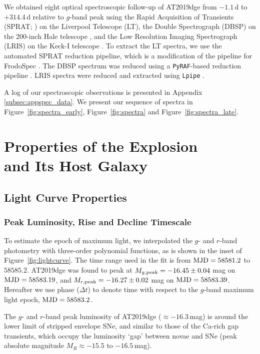 \documentclass[twocolumn]{aastex63}
\begin{document}
\begin{CJK*}{UTF8}{gbsn}
We obtained eight optical spectroscopic follow-up of AT2019dge from $-1.1$\,d to $+314.4$\,d relative 
to $g$-band peak using the Rapid Acquisition of Transients (SPRAT; \citealt{Piascik2014}) on the 
Liverpool Telescope (LT), the Double Spectrograph (DBSP) on the 200-inch Hale telescope 
\citep{Oke1982}, and the Low Resolution Imaging Spectrograph (LRIS) on the Keck-I telescope 
\citep{Oke1995}. To extract the LT spectra, we use the automated SPRAT reduction pipeline, which is a 
modification of the pipeline for FrodoSpec \citep{Barnsley2012}. The DBSP spectrum was reduced using 
a \texttt{PyRAF}-based reduction pipeline \citep{Bellm2016}. LRIS 
spectra were reduced and extracted using \texttt{Lpipe} \citep{Perley2019lpipe}. 

A log of our spectroscopic observations is presented in Appendix \ref{subsec:appspec_data}. We 
present our sequence of spectra in Figure~\ref{fig:spectra_early}, Figure~\ref{fig:spectra} and 
Figure~\ref{fig:spectra_late}.

\section{Properties of the Explosion \\and Its Host Galaxy}
\subsection{Light Curve Properties}\label{subsec:lc_properties}

\subsubsection{Peak Luminosity, Rise and Decline Timescale}
To estimate the epoch of maximum light, we interpolated the $g$- and $r$-band photometry with 
three-order polynomial functions, as is shown in the inset of Figure~\ref{fig:lightcurve}. The time range 
used in the fit is from ${\rm MJD}=58581.2$ to $58585.2$. AT2019dge was found to peak 
at $M_{g\rm , peak}=-16.45\pm0.04$ mag on ${\rm MJD}=58583.19$, and $M_{r \rm ,peak } 
=-16.27\pm0.02$ mag on ${\rm MJD}=58583.39$. Hereafter we use phase ($\Delta t$) to denote time
with respect to the $g$-band maximum light epoch, ${\rm MJD}=58583.2$.

The $g$- and $r$-band peak luminosity of AT2019dge ($\approx -16.3$\,mag) is around the lower limit 
of stripped envelope SNe, and similar to those of the Ca-rich gap transients, which occupy the 
luminosity `gap' between novae and SNe (peak absolute magnitude $M_R \approx 
-15.5$ to $-16.5$\,mag).


\end{CJK*}
\end{document}
